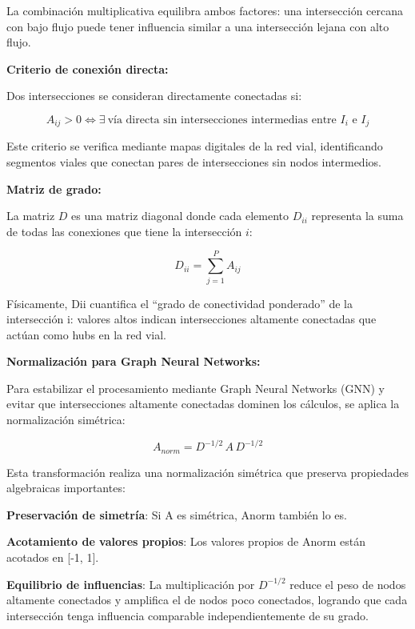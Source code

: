 \documentclass[12pt,a4paper,oneside]{report}
\begin{document}
La combinación multiplicativa equilibra ambos factores: una intersección cercana con bajo flujo puede tener influencia similar a una intersección lejana con alto flujo.

\textbf{Criterio de conexión directa:}

Dos intersecciones se consideran directamente conectadas si:

\begin{equation}
A_{ij} > 0 \iff \exists\ \text{vía directa sin intersecciones intermedias entre } I_{i} \text{ e } I_{j}
\end{equation}

Este criterio se verifica mediante mapas digitales de la red vial, identificando segmentos viales que conectan pares de intersecciones sin nodos intermedios.

\textbf{Matriz de grado:}

La matriz \(D\) es una matriz diagonal donde cada elemento \(D_{ii}\) representa la suma de todas las conexiones que tiene la intersección \(i\):

\begin{equation}
D_{ii} = \sum_{j = 1}^{P}A_{ij}
\label{eq:grado}
\end{equation}

Físicamente, Dii cuantifica el ``grado de conectividad ponderado'' de la intersección i: valores altos indican intersecciones altamente conectadas que actúan como hubs en la red vial.

\textbf{Normalización para Graph Neural Networks:}

Para estabilizar el procesamiento mediante Graph Neural Networks (GNN) y evitar que intersecciones altamente conectadas dominen los cálculos, se aplica la normalización simétrica:

\begin{equation}
A_{norm} = D^{-1/2}\,A\,D^{-1/2}
\label{eq:anorm}
\end{equation}

Esta transformación realiza una normalización simétrica que preserva propiedades algebraicas importantes:

\textbf{Preservación de simetría}: Si A es simétrica, Anorm también lo es.

\textbf{Acotamiento de valores propios}: Los valores propios de Anorm están acotados en {[}-1, 1{]}.

\textbf{Equilibrio de influencias}: La multiplicación por \(D^{- 1/2}\) reduce el peso de nodos altamente conectados y amplifica el de nodos poco conectados, logrando que cada intersección tenga influencia comparable independientemente de su grado.
\end{document}
